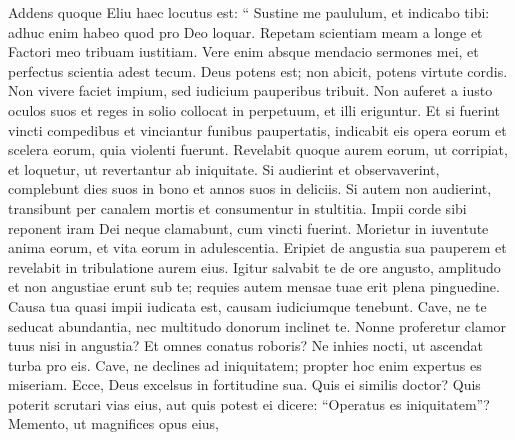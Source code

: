 \begin{biblechapter}
\begin{biblechapter}
\begin{biblechapter}
\begin{biblechapter}
\begin{biblechapter}
\begin{biblechapter}
\begin{biblechapter}
\begin{biblechapter}
\begin{biblechapter}
\begin{biblechapter}
\begin{biblechapter}
\begin{biblechapter}
\begin{biblechapter}
\begin{biblechapter}
\begin{biblechapter}
\begin{biblechapter}
\begin{biblechapter}
\begin{biblechapter}
\begin{biblechapter}
\begin{biblechapter}
\begin{biblechapter}
\begin{biblechapter}
\begin{biblechapter}
\begin{biblechapter}
\begin{biblechapter}
\begin{biblechapter}
\begin{biblechapter}
\begin{biblechapter}
\begin{biblechapter}
\begin{biblechapter}
\begin{biblechapter}
\begin{biblechapter}
\begin{biblechapter}
\begin{biblechapter}
\begin{biblechapter}
\begin{biblechapter}
\verse Addens quoque Eliu haec locutus est:
 \verse “ Sustine me paululum, et indicabo tibi:
 adhuc enim habeo quod pro Deo loquar.
 \verse Repetam scientiam meam a longe
 et Factori meo tribuam iustitiam.
 \verse Vere enim absque mendacio sermones mei,
 et perfectus scientia adest tecum.
 \verse Deus potens est; non abicit,
 potens virtute cordis.
 \verse Non vivere faciet impium,
 sed iudicium pauperibus tribuit.
 \verse Non auferet a iusto oculos suos
 et reges in solio collocat in perpetuum,
 et illi eriguntur.
 \verse Et si fuerint vincti compedibus
 et vinciantur funibus paupertatis,
 \verse indicabit eis opera eorum
 et scelera eorum, quia violenti fuerunt.
 \verse Revelabit quoque aurem eorum, ut corripiat,
 et loquetur, ut revertantur ab iniquitate.
 \verse Si audierint et observaverint,
 complebunt dies suos in bono
 et annos suos in deliciis.
 \verse Si autem non audierint, transibunt per canalem mortis
 et consumentur in stultitia.
 \verse Impii corde sibi reponent iram Dei
 neque clamabunt, cum vincti fuerint.
 \verse Morietur in iuventute anima eorum,
 et vita eorum in adulescentia.
 \verse Eripiet de angustia sua pauperem
 et revelabit in tribulatione aurem eius.
 \verse Igitur salvabit te de ore angusto,
 amplitudo et non angustiae erunt sub te;
 requies autem mensae tuae erit plena pinguedine.
 \verse Causa tua quasi impii iudicata est,
 causam iudiciumque tenebunt.
 \verse Cave, ne te seducat abundantia,
 nec multitudo donorum inclinet te.
 \verse Nonne proferetur clamor tuus nisi in angustia?
 Et omnes conatus roboris?
 \verse Ne inhies nocti,
 ut ascendat turba pro eis.
 \verse Cave, ne declines ad iniquitatem;
 propter hoc enim expertus es miseriam.
 \verse Ecce, Deus excelsus in fortitudine sua.
 Quis ei similis doctor?
 \verse Quis poterit scrutari vias eius,
 aut quis potest ei dicere: “Operatus es iniquitatem”?
 \verse Memento, ut magnifices opus eius,

\end{biblechapter}
\end{biblechapter}
\end{biblechapter}
\end{biblechapter}
\end{biblechapter}
\end{biblechapter}
\end{biblechapter}
\end{biblechapter}
\end{biblechapter}
\end{biblechapter}
\end{biblechapter}
\end{biblechapter}
\end{biblechapter}
\end{biblechapter}
\end{biblechapter}
\end{biblechapter}
\end{biblechapter}
\end{biblechapter}
\end{biblechapter}
\end{biblechapter}
\end{biblechapter}
\end{biblechapter}
\end{biblechapter}
\end{biblechapter}
\end{biblechapter}
\end{biblechapter}
\end{biblechapter}
\end{biblechapter}
\end{biblechapter}
\end{biblechapter}
\end{biblechapter}
\end{biblechapter}
\end{biblechapter}
\end{biblechapter}
\end{biblechapter}
\end{biblechapter}
